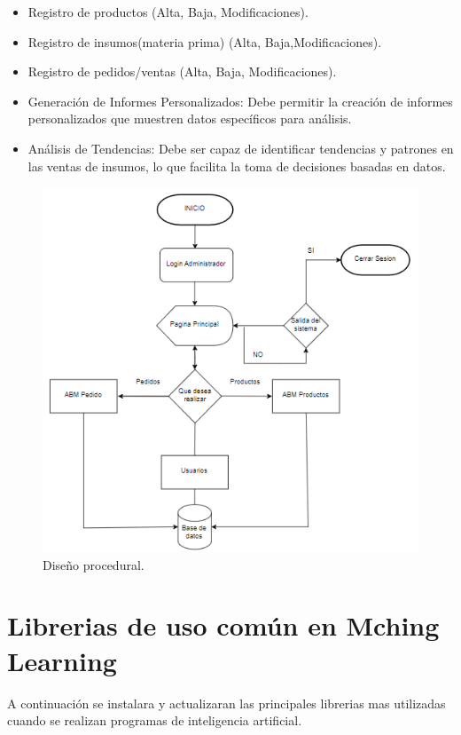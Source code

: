 \begin{itemize}
\item Registro de productos (Alta, Baja, Modificaciones).
\item Registro de insumos(materia prima) (Alta, Baja,Modificaciones). 
\item Registro de pedidos/ventas (Alta, Baja, Modificaciones).
\item Generación de Informes Personalizados: Debe permitir la creación de informes personalizados que muestren datos específicos para análisis.
\item Análisis de Tendencias: Debe ser capaz de identificar tendencias y patrones en las ventas de insumos, lo que facilita la toma de decisiones basadas en datos.

\end{itemize}
\begin{figure}[H]
    \begin{center}
      \includegraphics[scale=0.90]{./diseño_procedural.png}
      \caption{Diseño procedural.}
      \label{fig:diseño_procedural}
    \end{center}
  \end{figure}
  
\section{Librerias de uso común en Mching Learning}
A continuación se instalara y actualizaran las principales librerias mas utilizadas cuando se realizan programas de inteligencia artificial.

